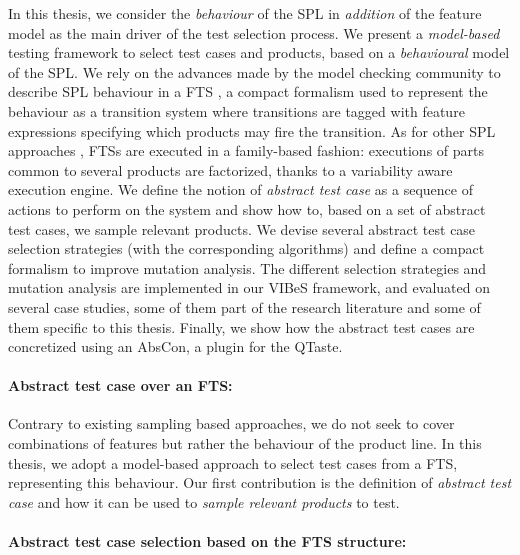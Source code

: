 In this thesis, we consider the \emph{behaviour} of the SPL in \emph{addition} of the feature model as the main driver of the test selection process. We present a \emph{model-based} testing framework to select test cases and products, based on a \emph{behavioural} model of the SPL. We rely on the advances made by the model checking community to describe SPL behaviour in a \gls{FTS} \cite{Classen2013b}, a compact formalism used to represent the behaviour as a transition system where transitions are tagged with feature expressions specifying which products may fire the transition. 
As for other SPL approaches \cite{Nguyen2014,Struber2015,Kim2013a}, \glspl{FTS} are executed in a family-based fashion: \ie executions of parts common to several products are factorized, thanks to a variability aware execution engine.
We define the notion of \emph{\gls{abstract test case}} as a sequence of actions to perform on the system and show how to, based on a set of abstract test cases, we sample relevant products. We devise several abstract test case selection strategies (with the corresponding algorithms) and define a compact formalism to improve mutation analysis. The different selection strategies and mutation analysis are implemented in our \gls{VIBeS} framework, and evaluated on several case studies, some of them part of the research literature and some of them specific to this thesis. Finally, we show how the abstract test cases are concretized using an \gls{AbsCon}, a plugin for the \gls{QTaste}. 


\paragraph{Abstract test case over an FTS:}

Contrary to existing sampling based approaches, we do not seek to cover combinations of features but rather the behaviour of the product line.
In this thesis, we adopt a model-based approach to select test cases from a \gls{FTS}, representing this behaviour. Our first contribution is the definition of \emph{\gls{abstract test case}} and how it can be used to \emph{sample relevant products} to test.

\paragraph{Abstract test case selection based on the FTS structure:}

